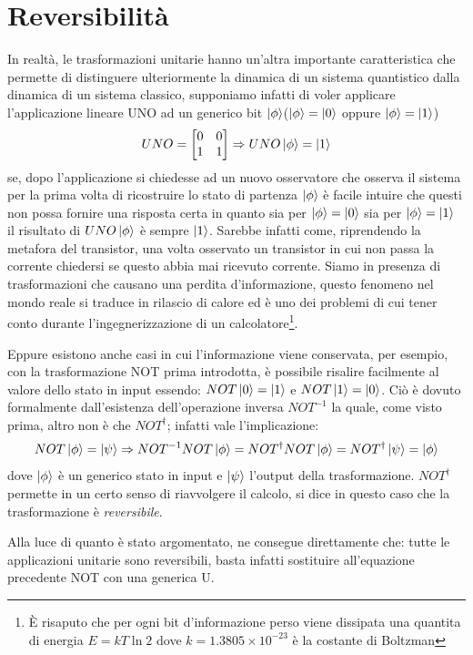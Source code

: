 \documentclass[12pt,a4paper,openright]{report}
\begin{document}
\section{Reversibilità}
In realtà, le trasformazioni unitarie hanno un'altra importante caratteristica che permette di distinguere ulteriormente la dinamica di un sistema quantistico
dalla dinamica di un sistema classico, supponiamo infatti di voler applicare l'applicazione lineare UNO ad un generico bit $\ket{\phi}$($\ket{\phi}=\ket0$ oppure $\ket{\phi}=\ket1$)
\[
UNO=
    \begin{bmatrix}
        0 & 0\\
        1 & 1 
    \end{bmatrix}
    \Rightarrow
    UNO\ket{\phi} = \ket1
\]
se, dopo l'applicazione si chiedesse ad un nuovo osservatore che osserva il sistema per la prima volta di ricostruire lo stato di partenza $\ket{\phi}$
è facile intuire che questi non possa fornire una risposta certa in quanto sia per $\ket{\phi}=\ket0$ sia per $\ket{\phi}=\ket1$ il risultato di $UNO\ket{\phi}$
è sempre $\ket{1}$. Sarebbe infatti come, riprendendo la metafora del transistor, una volta osservato un transistor in cui non passa la
corrente chiedersi se questo abbia mai ricevuto corrente. Siamo in presenza di trasformazioni che causano una perdita d'informazione,
questo fenomeno nel mondo reale si traduce in rilascio di calore ed è uno dei problemi di cui tener conto durante l'ingegnerizzazione di un calcolatore\footnote{È risaputo che per ogni bit d'informazione perso viene dissipata una quantita di energia $E = kT\ln2$ dove $k=1.3805\times10^{-23}$ è la costante di Boltzman}. \par 
Eppure esistono anche casi in cui l'informazione viene conservata, per esempio, con la trasformazione NOT prima introdotta, è possibile risalire facilmente al 
valore dello stato in input essendo: $NOT\ket0 = \ket1$ e $NOT\ket1 = \ket0$. Ciò è dovuto formalmente dall'esistenza dell'operazione inversa $NOT^{-1}$ la quale,
come visto prima, altro non è che $NOT^{\dag}$; infatti vale l'implicazione: \[NOT\ket{\phi}=\ket{\psi}\Rightarrow NOT^{-1}NOT\ket{\phi}= NOT^{\dag}NOT\ket{\phi}=NOT^{\dag}\ket{\psi}=\ket{\phi}\] dove 
$\ket{\phi}$ è un generico stato in input e $\ket{\psi}$ l'output della trasformazione. $NOT^{\dag}$ permette in un certo senso di riavvolgere il calcolo, si dice in questo caso che
la trasformazione è \emph{reversibile}.\par
Alla luce di quanto è stato argomentato, ne consegue direttamente che: tutte le applicazioni unitarie sono reversibili, basta infatti sostituire all'equazione precedente NOT con una generica U. 
\end{document}
